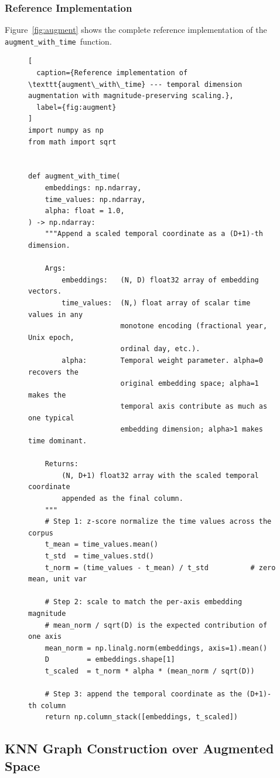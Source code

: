 \documentclass[12pt,letterpaper]{article}
\newcommand{\augtime}{\texttt{augment\_with\_time}}
\begin{document}
\subsubsection{Reference Implementation}

Figure~\ref{fig:augment} shows the complete reference implementation of the
\augtime\ function.

\begin{figure}[H]
\begin{lstlisting}[
  caption={Reference implementation of \texttt{augment\_with\_time} --- temporal dimension augmentation with magnitude-preserving scaling.},
  label={fig:augment}
]
import numpy as np
from math import sqrt


def augment_with_time(
    embeddings: np.ndarray,
    time_values: np.ndarray,
    alpha: float = 1.0,
) -> np.ndarray:
    """Append a scaled temporal coordinate as a (D+1)-th dimension.

    Args:
        embeddings:   (N, D) float32 array of embedding vectors.
        time_values:  (N,) float array of scalar time values in any
                      monotone encoding (fractional year, Unix epoch,
                      ordinal day, etc.).
        alpha:        Temporal weight parameter. alpha=0 recovers the
                      original embedding space; alpha=1 makes the
                      temporal axis contribute as much as one typical
                      embedding dimension; alpha>1 makes time dominant.

    Returns:
        (N, D+1) float32 array with the scaled temporal coordinate
        appended as the final column.
    """
    # Step 1: z-score normalize the time values across the corpus
    t_mean = time_values.mean()
    t_std  = time_values.std()
    t_norm = (time_values - t_mean) / t_std          # zero mean, unit var

    # Step 2: scale to match the per-axis embedding magnitude
    # mean_norm / sqrt(D) is the expected contribution of one axis
    mean_norm = np.linalg.norm(embeddings, axis=1).mean()
    D         = embeddings.shape[1]
    t_scaled  = t_norm * alpha * (mean_norm / sqrt(D))

    # Step 3: append the temporal coordinate as the (D+1)-th column
    return np.column_stack([embeddings, t_scaled])
\end{lstlisting}
\end{figure}

\subsection{KNN Graph Construction over Augmented Space}
\end{document}
